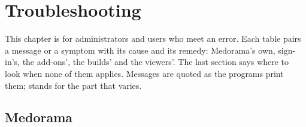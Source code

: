 \chapter{Troubleshooting}
\label{chap:troubleshooting}

This chapter is for administrators and users who meet an error. Each table pairs a message or
a symptom with its cause and its remedy: Medorama's own, sign-in's, the add-ons', the builds' and
the viewers'. The last section says where to look when none of them applies. Messages are quoted
as the programs print them;  stands for the part that varies.

\section{Medorama}
\label{sec:troubleshooting-medorama}

